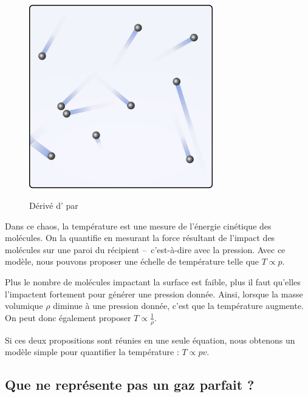 		\begin{figure}
			\begin{center}
				\includegraphics[width=8cm]{images/gaz_boules.png}
			\end{center}
			{Dérivé d’ \ccbysa par }
			\label{fig_gaz_boules}
		\end{figure}
		
		Dans ce chaos, la température est une mesure de l’énergie cinétique des molécules. On la quantifie en mesurant la force résultant de l’impact des molécules sur une paroi du récipient --\ c’est-à-dire avec la pression. Avec ce modèle, nous pouvons proposer une échelle de température telle que $T \propto p$.
		
		Plus le nombre de molécules impactant la surface est faible, plus il faut qu’elles l’impactent fortement pour générer une pression donnée. Ainsi, lorsque la masse volumique $\rho$ diminue à une pression donnée, c’est que la température augmente. On peut donc également proposer $T \propto \frac{1}{\rho}$.
		
		Si ces deux propositions sont réunies en une seule équation, nous obtenons un modèle simple pour quantifier la température : $T \propto p v$.
		
		
	\subsection{Que ne représente pas un gaz parfait ?}
	\label{ch_pas_gaz_parfait}
	
